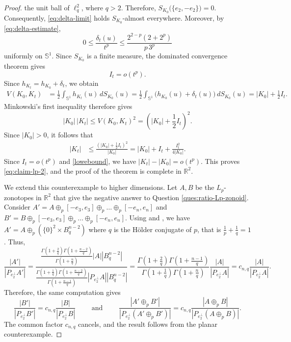 \documentclass[11pt,a4paper]{amsart}
\theoremstyle{plain}
\theoremstyle{definition}
\newcommand{\R}{\mathbb R}
\begin{document}
\begin{proof}
the unit ball of \(\ell_q^2\), where
$
    q>2.$  Therefore,
$ 
    S_{K_0}\bigl(\{e_2,-e_2\}\bigr)=0.
$
Consequently, \eqref{eq:delta-limit} holds
\(S_{K_0}\)-almost everywhere. Moreover, by
\eqref{eq:delta-estimate},
\[
    0
    \leq
    \frac{\delta_t(u)}{t^p}
    \leq
    \frac{2^{2-p}(2+2^p)}{p\,3^p}
\]
uniformly on \(\mathbb S^1\). Since \(S_{K_0}\) is a finite measure,
the dominated convergence theorem gives
\[
    I_t=o(t^p).
\]
Since \(h_{K_t}=h_{K_0}+\delta_t\), we obtain
\[
\begin{aligned}
    V(K_0,K_t)
    &=
    \frac12
    \int_{\mathbb S^1}
        h_{K_t}(u)\,dS_{K_0}(u)=
    \frac12
    \int_{\mathbb S^1}
        \bigl(h_{K_0}(u)+\delta_t(u)\bigr)
        \,dS_{K_0}(u)=
    |K_0|+\frac12 I_t.
\end{aligned}
\]
Minkowski's first inequality therefore gives
\[
    |K_0|\,|K_t|
    \leq
    V(K_0,K_t)^2
    =
    \left(
        |K_0|+\frac12 I_t
    \right)^2.
\]
Since \(|K_0|>0\), it follows that
\[
\begin{aligned}
    |K_t|
    &\leq
    \frac{
        \left(|K_0|+\frac12 I_t\right)^2
    }{|K_0|}
    =
    |K_0|+I_t+\frac{I_t^2}{4|K_0|}.
\end{aligned}
\]
Since  \(I_t=o(t^p)\) and \eqref{lowebound}, we  have $|K_t|-|K_0|=o(t^p)$.
This proves \eqref{eq:claim-lp-2}, and the proof of the theorem is complete in $\R^2$.

    We extend this counterexample to higher dimensions. Let $A,B$ be the $L_p$-zonotopes in $\R^2$ that give the negative answer to Question \ref{ques:ratio-Lp-zonoid}. Consider $A' = A \oplus_p [-e_3,e_3]\oplus_p \ldots \oplus_p [-e_n,e_n]$ and $B' =B \oplus_p [-e_3,e_3]\oplus_p \ldots \oplus_p[-e_n,e_n]$. Using \cite[Lemma 8]{FMMN-26-2} and \cite[Lemma  15]{MNZ-25}, we have $A' = A \oplus_p (\{0\}^2 \times B_q^{n-2})$ where $q$ is  the H\"older conjugate of $p$, that is $\frac{1}{p} + \frac{1}{q} = 1$. Thus,
    \[
        \frac{|A'|}{|P_{e_2^\perp}A'|} = \frac{\frac{\Gamma\left(1+\frac{2}{q}\right) \Gamma\left(1+\frac{n-2}{q}\right)}{\Gamma\left(1+\frac{n}{q}\right)}|A||B_q^{n-2}|}{\frac{\Gamma\left(1+\frac{1}{q}\right) \Gamma\left(1+\frac{n-2}{q}\right)}{\Gamma\left(1+\frac{n-1}{q}\right)}|P_{e_2^\perp}A||B_q^{n-2}|}
        =
        \frac{\Gamma\left(1+\frac{2}{q}\right) \Gamma\left(1+\frac{n-1}{q}\right)}{\Gamma\left(1+\frac{1}{q}\right) \Gamma\left(1+\frac{n}{q}\right)} \frac{|A|}{|P_{e_2^\perp}A|}= c_{n,q} \frac{|A|}{|P_{e_2^\perp}A|}.
    \]
    Therefore, the same computation gives 
    $$\frac{|B'|}{|P_{e_2^\perp}B'|} = c_{n,q} \frac{|B|}{|P_{e_2^\perp}B|} \qquad\mbox{ and }\qquad \frac{|A'\oplus_p B'|} {|P_{e_2^\perp}(A'\oplus_p B')|} = c_{n,q} \frac{|A\oplus_p B|} {|P_{e_2^\perp}(A\oplus_p B)|}. 
    $$
    The common factor $c_{n,q}$ cancels, and the result follows from the planar counterexample.
    \end{proof}
    
\end{document}

